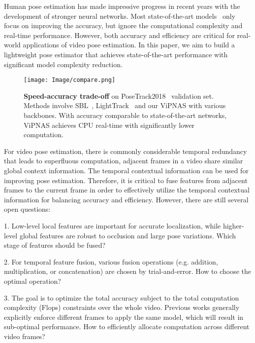 \documentclass[final]{cvpr}
\begin{document}
Human pose estimation has made impressive progress in recent years with the development of stronger neural networks. Most state-of-the-art models~\cite{newell2016stacked,sun2019deep,xiao2018simple} only focus on improving the accuracy, but ignore the computational complexity and real-time performance. However, both accuracy and efficiency are critical for real-world applications of video pose estimation. In this paper, we aim to build a lightweight pose estimator that achieves state-of-the-art performance with significant model complexity reduction. 

\begin{figure}[t]
	\centering
	\texttt{[image: Image/compare.png]}
	\caption{
	\textbf{Speed-accuracy trade-off} on PoseTrack2018~\cite{andriluka2018posetrack} validation set. Methods involve SBL~\cite{xiao2018simple}, LightTrack~\cite{ning2019lighttrack} and our ViPNAS with various backbones. With accuracy comparable to state-of-the-art networks, ViPNAS achieves CPU real-time with significantly lower computation.
	}
	\label{fig:compare}
\end{figure}

For video pose estimation, there is commonly considerable temporal redundancy that leads to superfluous computation, \ie adjacent frames in a video share similar global context information. The temporal contextual information can be used for improving pose estimation. Therefore, it is critical to fuse features from adjacent frames to the current frame in order to effectively utilize the temporal contextual information for balancing accuracy and efficiency. However, there are still several open questions:

1. Low-level local features are important for accurate localization, while higher-level global features are robust to occlusion and large pose variations. Which stage of features should be fused? 

2. For temporal feature fusion, various fusion operations (e.g. addition, multiplication, or concatenation) are chosen by trial-and-error. How to choose the optimal operation?

3. The goal is to optimize the total accuracy subject to the total computation complexity (Flops) constraints over the whole video. Previous works generally explicitly enforce different frames to apply the same model, which will result in sub-optimal performance. How to efficiently allocate computation across different video frames?
\end{document}
